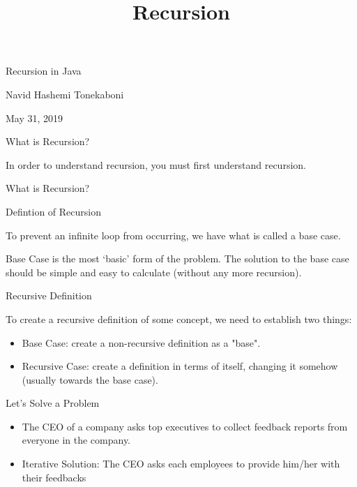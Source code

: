 \documentclass[11pt]{article}
\title{Recursion}
\providecommand{\tightlist}{%
      \setlength{\itemsep}{0pt}\setlength{\parskip}{0pt}}
\begin{document}
    
    
    \maketitle
    
    

    
    Recursion in Java

Navid Hashemi Tonekaboni

May 31, 2019

 

    What is Recursion?

    In order to understand recursion, you must first understand recursion.

    

    What is Recursion?

    

    Defintion of Recursion

    

    To prevent an infinite loop from occurring, we have what is called a
base case.

     Base Case is the most `basic' form of the problem. The solution to the
base case should be simple and easy to calculate (without any more
recursion).

    Recursive Definition

    To create a recursive definition of some concept, we need to establish
two things:

    \begin{itemize}
\tightlist
\item
  Base Case: create a non-recursive definition as a "base".
\item
  Recursive Case: create a definition in terms of itself, changing it
  somehow (usually towards the base case).
\end{itemize}

    Let's Solve a Problem

\begin{itemize}
\tightlist
\item
  The CEO of a company asks top executives to collect feedback reports
  from everyone in the company.
\end{itemize}

    \begin{itemize}
\tightlist
\item
  Iterative Solution: The CEO asks each employees to provide him/her
  with their feedbacks
\end{itemize}
\end{document}
